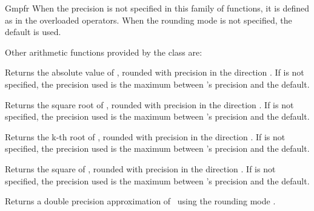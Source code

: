 \begin{ccRefClass} {Gmpfr}
When the precision is not specified in this family of functions, it is
defined as in the overloaded operators. When the rounding mode is not
specified, the default is used.

Other arithmetic functions provided by the class are:

        {Returns the absolute value of \ccVar, rounded with precision
         in the direction . If  is not specified,
        the precision used is the maximum between \ccVar 's precision
        and the default.}

        {Returns the square root of \ccVar, rounded with precision
         in the direction . If  is not specified,
        the precision used is the maximum between \ccVar 's precision
        and the default.}


        {Returns the k-th root of \ccVar, rounded with precision
         in the direction . If  is not specified,
        the precision used is the maximum between \ccVar 's precision
        and the default.}

        {Returns the square of \ccVar, rounded with precision  in
        the direction . If  is not specified, the precision
        used is the maximum between \ccVar 's precision and the default.}



        {Returns a double precision approximation of \ccVar~using the
        rounding mode .}


\end{ccRefClass}

